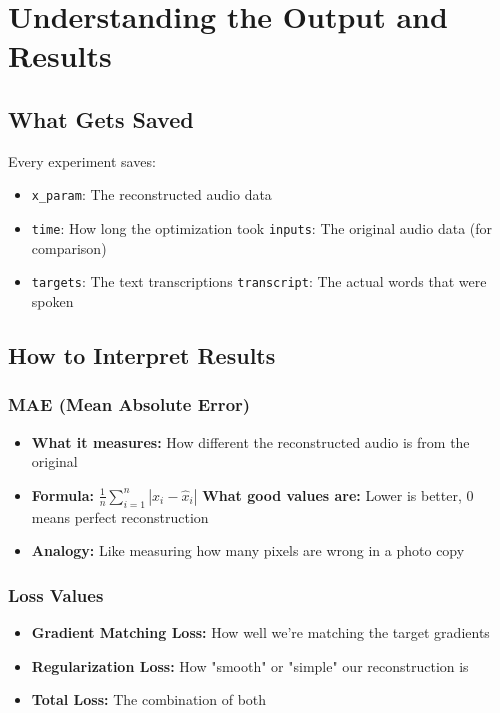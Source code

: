 \documentclass[12pt]{article}
\begin{document}
\section{Understanding the Output and Results}

\subsection{What Gets Saved}

Every experiment saves:
\begin{itemize}
    \item \texttt{x\_param}: The reconstructed audio data
    \item \texttt{time}: How long the optimization took
    \texttt{inputs}: The original audio data (for comparison)
    \item \texttt{targets}: The text transcriptions
    \texttt{transcript}: The actual words that were spoken
\end{itemize}

\subsection{How to Interpret Results}

\subsubsection{MAE (Mean Absolute Error)}
\begin{itemize}
    \item \textbf{What it measures:} How different the reconstructed audio is from the original
    \item \textbf{Formula:} $\frac{1}{n}\sum_{i=1}^{n}|x_i - \hat{x}_i|$
    \textbf{What good values are:} Lower is better, 0 means perfect reconstruction
    \item \textbf{Analogy:} Like measuring how many pixels are wrong in a photo copy
\end{itemize}

\subsubsection{Loss Values}
\begin{itemize}
    \item \textbf{Gradient Matching Loss:} How well we're matching the target gradients
    \item \textbf{Regularization Loss:} How "smooth" or "simple" our reconstruction is
    \item \textbf{Total Loss:} The combination of both
\end{itemize}
\end{document}
